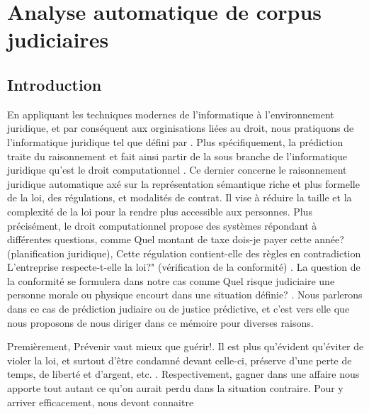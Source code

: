 \chapter{Analyse automatique de corpus judiciaires}
\label{chap:literature}



\section{Introduction}
En appliquant les techniques modernes de l'informatique à l'environnement juridique, et par conséquent aux orginisations liées au droit, nous pratiquons de l'\og informatique juridique \fg{} tel que défini par \citet{erdelez1997legalinformatics}. Plus spécifiquement, la prédiction traite du raisonnement et fait ainsi partir de la sous branche de  l'\og informatique juridique \fg{} qu'est le \og droit computationnel \fg{}. Ce dernier concerne le raisonnement juridique automatique  axé sur la représentation sémantique riche et plus formelle de la loi, des régulations, et modalités de contrat. Il vise à réduire la taille et la complexité de la loi pour la rendre plus accessible aux personnes. Plus précisément, le \og droit computationnel \fg{} propose des systèmes répondant à différentes questions, comme \og Quel montant de taxe dois-je payer cette année? \fg{} (planification juridique), \og Cette régulation contient-elle des règles en contradiction\fg{} \og L'entreprise respecte-t-elle la loi?" (vérification de la conformité) \citep{Genesereth2015computationallaw}. La question de la conformité se formulera dans notre cas comme \og Quel risque judiciaire une personne morale ou physique encourt dans une situation définie? \fg{}. Nous parlerons dans ce cas de prédiction judiaire ou de justice prédictive, et c'est vers elle que nous proposons de nous diriger dans ce mémoire pour diverses raisons.

Premièrement, \og Prévenir vaut mieux que guérir!\fg{}. Il est plus qu'évident qu'éviter de violer la loi, et surtout d'être condamné devant celle-ci, préserve d'une perte de temps, de liberté et d'argent, etc. . Respectivement, \og gagner dans une affaire \fg{} nous apporte tout autant ce qu'on aurait perdu dans la situation contraire.   Pour y arriver efficacement, nous devont connaitre 


